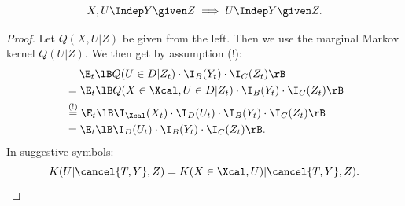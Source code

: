 \begin{Lem}
    \[X,U \Indep  Y \given Z \implies U \Indep  Y \given Z.\]
\begin{proof}
    Let $Q(X,U|Z)$ be given from the left. Then we use the marginal Markov kernel $Q(U|Z)$.
    We then get by assumption (!):
    \begin{align*}                  
      & \quad\; \E_t\lB Q(U \in D| Z_t) \cdot\I_B(Y_t) \cdot \I_C(Z_t) \rB \\
      & = \E_t\lB Q( X \in \Xcal, U \in D| Z_t) \cdot\I_B(Y_t) \cdot \I_C(Z_t) \rB \\
      & \stackrel{(!)}{=} \E_t\lB \I_\Xcal(X_t) \cdot \I_D(U_t) \cdot\I_B(Y_t) \cdot \I_C(Z_t) \rB \\
      & = \E_t\lB \I_D(U_t) \cdot\I_B(Y_t) \cdot \I_{C}(Z_t) \rB.
    \end{align*}
 In suggestive symbols:
 \[ K(U|\cancel{T,Y},Z) = K(X \in \Xcal,U)|\cancel{T,Y},Z). \]
\end{proof}
\end{Lem}

